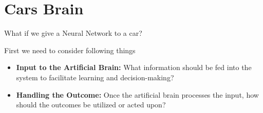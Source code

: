 \documentclass{beamer}
\begin{document}
\section{Cars Brain}
\begin{frame}{What if we give a Neural Network to a car?}
    \begin{alertblock}{First we need to consider following things}

\begin{itemize}
        \item \textbf{Input to the Artificial Brain:} What information should be fed into the system to facilitate learning and decision-making?
        \item \textbf{Handling the Outcome:} Once the artificial brain processes the input, how should the outcomes be utilized or acted upon?
\end{itemize}
\end{alertblock}

\end{frame}
\end{document}
